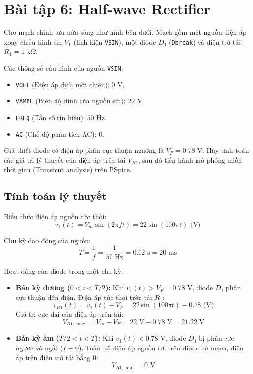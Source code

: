 \section{Bài tập 6: Half-wave Rectifier}

Cho mạch chỉnh lưu nửa sóng như hình bên dưới. Mạch gồm một nguồn điện áp xoay chiều hình sin $V_1$ (linh kiện \texttt{VSIN}), một diode $D_1$ (\texttt{Dbreak}) và điện trở tải $R_1 = 1\text{ k}\Omega$.

Các thông số cấu hình của nguồn \texttt{VSIN}:
\begin{itemize}[leftmargin=1.5em]
  \item \texttt{VOFF} (Điện áp dịch một chiều): $0\text{ V}$.
  \item \texttt{VAMPL} (Biên độ đỉnh của nguồn sin): $22\text{ V}$.
  \item \texttt{FREQ} (Tần số tín hiệu): $50\text{ Hz}$.
  \item \texttt{AC} (Chế độ phân tích AC): $0$.
\end{itemize}
Giả thiết diode có điện áp phân cực thuận ngưỡng là $V_F = 0.78\text{ V}$. Hãy tính toán các giá trị lý thuyết của điện áp trên tải $V_{R1}$, sau đó tiến hành mô phỏng miền thời gian (Transient analysis) trên PSpice.


\subsection{Tính toán lý thuyết}
Biểu thức điện áp nguồn tức thời:
\begin{equation}
  v_1(t) = V_m \sin(2\pi f t) = 22 \sin(100\pi t)\text{ (V)}
\end{equation}

\noindent Chu kỳ dao động của nguồn:
\begin{equation}
  T = \frac{1}{f} = \frac{1}{50\text{ Hz}} = 0.02\text{ s} = 20\text{ ms}
\end{equation}

\noindent Hoạt động của diode trong một chu kỳ:
\begin{itemize}[leftmargin=1.5em]
  \item \textbf{Bán kỳ dương ($0 < t < T/2$):} Khi $v_1(t) > V_F = 0.78\text{ V}$, diode $D_1$ phân cực thuận dẫn điện. Điện áp tức thời trên tải $R_1$:
  \begin{equation}
    v_{R1}(t) = v_1(t) - V_F = 22 \sin(100\pi t) - 0.78\text{ (V)}
  \end{equation}
  Giá trị cực đại của điện áp trên tải:
  \begin{equation}
    V_{R1,\max} = V_m - V_F = 22\text{ V} - 0.78\text{ V} = 21.22\text{ V}
  \end{equation}
  \item \textbf{Bán kỳ âm ($T/2 < t < T$):} Khi $v_1(t) < 0.78\text{ V}$, diode $D_1$ bị phân cực ngược và ngắt ($I = 0$). Toàn bộ điện áp nguồn rơi trên diode hở mạch, điện áp trên điện trở tải bằng $0$:
  \begin{equation}
    V_{R1,\min} = 0\text{ V}
  \end{equation}
\end{itemize}

